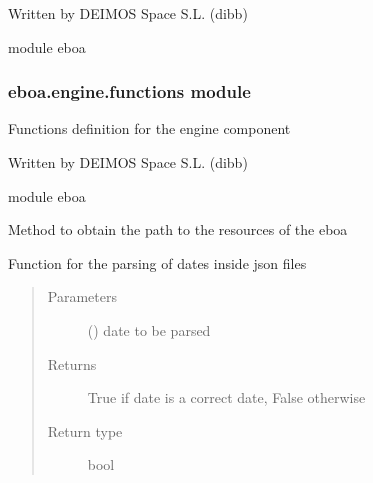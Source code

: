 Written by DEIMOS Space S.L. (dibb)

module eboa

\begin{fulllineitems}
\label{\detokenize{eboa.engine:eboa.engine.export.build_values_structure}}
\end{fulllineitems}



\subsubsection{eboa.engine.functions module}
\label{\detokenize{eboa.engine:module-eboa.engine.functions}}\label{\detokenize{eboa.engine:eboa-engine-functions-module}}
Functions definition for the engine component

Written by DEIMOS Space S.L. (dibb)

module eboa

\begin{fulllineitems}
\label{\detokenize{eboa.engine:eboa.engine.functions.get_resources_path}}
Method to obtain the path to the resources of the eboa

\end{fulllineitems}


\begin{fulllineitems}
\label{\detokenize{eboa.engine:eboa.engine.functions.is_datetime}}
Function for the parsing of dates inside json files
\begin{quote}\begin{description}
\item[{Parameters}] \leavevmode
{} () \textendash{} date to be parsed

\item[{Returns}] \leavevmode
True if date is a correct date, False otherwise

\item[{Return type}] \leavevmode
bool

\end{description}\end{quote}

\end{fulllineitems}

